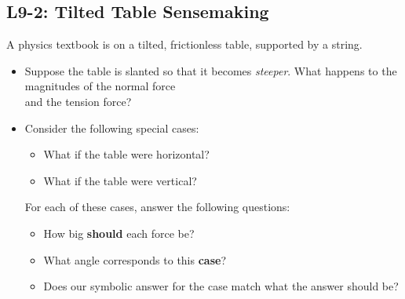 \documentclass[]{article}
\begin{document}
\newpage
\begin{TeacherMargin}

\end{TeacherMargin}
\begin{PresentSpace}
\vspace{-10pt}
\section*{L9-2: Tilted Table Sensemaking}
\vspace{-10pt}
A physics textbook is on a tilted, frictionless table, supported by a string.
\begin{itemize}
	\item Suppose the table is slanted so that it becomes \textit{steeper}. What happens to the magnitudes of the normal force \\
	and the tension force?%
	\begin{comment}
		\large
		\item Does the magnitude of the normal force \\
		\textit{increase}, \textit{decrease}, or \textit{stay the same}?
		\item Does the magnitude of the tension force \\ \textit{increase}, \textit{decrease}, or \textit{stay the same}?
	\end{comment}
	\item Consider the following special cases:
	\begin{itemize}
		\large
		\item What if the table were horizontal?
		\item What if the table were vertical?
	\end{itemize}
	\vspace{-8pt}
	For each of these cases, answer the following questions:
	\begin{itemize}
		\large
		\item How big \textbf{should} each force be?
		\item What angle corresponds to this \textbf{case}?
		\item Does our symbolic answer for the case match what the answer should be?
	\end{itemize}
	\begin{comment}
	\item What if the table were horizontal?
	\begin{itemize}

\end{comment}
\end{itemize}
\end{PresentSpace}
\end{document}
